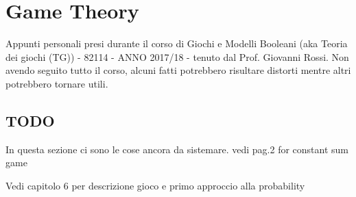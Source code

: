 \chapter{Game Theory}

Appunti personali presi durante il corso di Giochi e Modelli Booleani (aka Teoria dei giochi (TG)) - 82114 - ANNO 2017/18 - tenuto dal Prof. Giovanni Rossi. Non avendo seguito tutto il corso, alcuni fatti potrebbero risultare distorti mentre altri potrebbero tornare utili.

\section{TODO}
In questa sezione ci sono le cose ancora da sistemare.
vedi \cite{vorobev01} pag.2 for constant sum game

Vedi capitolo 6 per descrizione gioco e primo approccio alla probability



%




%
%
%
%



%
%
%
%
%
%








